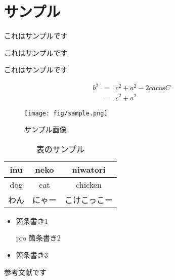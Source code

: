 \documentclass[dvipdfmx, a4paper, titlepage]{jsarticle}
\author{サンプル}
\begin{document}
 
\maketitle
\section{サンプル}
これはサンプルです

これはサンプルです

これはサンプルです

\begin{eqnarray}
b^2 &=& c^2 + a^2 - 2ca\textrm{cos}C \nonumber \\
&=& c^2 + a^2 \label{equ:sample}  
\end{eqnarray}

\begin{figure}[htbp]
\begin{center}
\texttt{[image: fig/sample.png]}
\caption{サンプル画像}
\label{fig:sample}
\end{center}
\end{figure}

\begin{table}[htbp]
 \caption{表のサンプル}
 \label{tab:sample}
 \centering
  \begin{tabular}{cc|c}
   \hline
	inu & neko & niwatori \\
   \hline \hline
	dog & cat & chicken \\
	わん & にゃー & こけこっこー \\ \hline
  \end{tabular}
\end{table}

\begin{itemize}
	\item 箇条書き1
	\item[pro] 箇条書き2
	\item 箇条書き3
\end{itemize}

\begin{thebibliography}{99}
\small{
     参考文献です
}
\end{thebibliography}
\end{document}

